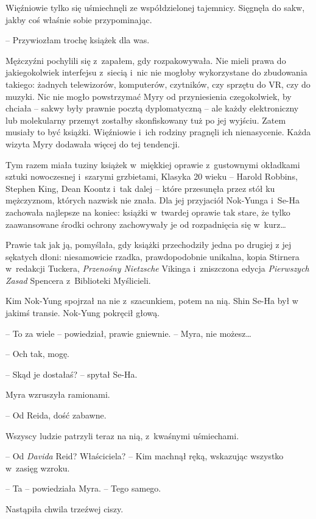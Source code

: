 \documentclass[oneside,polish,11pt,sfheadings]{mwbk}
\begin{document}
Więźniowie tylko się uśmiechnęli ze współdzielonej tajemnicy. Sięgnęła do
sakw, jakby coś właśnie sobie przypominając. 

-- Przywiozłam trochę
książek dla was.

Mężczyźni pochylili się z~zapałem, gdy rozpakowywała. Nie mieli prawa do
jakiegokolwiek interfejsu z~siecią i~nic nie mogłoby wykorzystane do
zbudowania takiego: żadnych telewizorów, komputerów, czytników, czy
sprzętu do VR, czy do muzyki. Nic nie mogło powstrzymać Myry od
przyniesienia czegokolwiek, by chciała -- sakwy były prawnie pocztą
dyplomatyczną -- ale każdy elektroniczny lub molekularny przemyt zostałby
skonfiskowany tuż po jej wyjściu. Zatem musiały to być książki.
Więźniowie i~ich rodziny pragnęli ich nienasycenie. Każda wizyta Myry
dodawała więcej do tej tendencji.

Tym razem miała tuziny książek w~miękkiej oprawie z~gustownymi okładkami
sztuki nowoczesnej i~szarymi grzbietami, Klasyka 20 wieku -- Harold
Robbins, Stephen King, Dean Koontz i~tak dalej -- które przesunęła przez
stół ku mężczyznom, których nazwisk nie znała. Dla jej przyjaciół
Nok-Yunga i~Se-Ha zachowała najlepsze na koniec: książki w~twardej
oprawie tak stare, że tylko zaawansowane środki ochrony zachowywały je
od rozpadnięcia się w~kurz\ldots

Prawie tak jak ją, pomyślała, gdy książki przechodziły jedna po drugiej
z jej sękatych dłoni: niesamowicie rzadka, prawdopodobnie unikalna,
kopia Stirnera w~redakcji Tuckera, \textit{Przenośny Nietzsche} Vikinga i~zniszczona edycja \textit{Pierwszych Zasad} Spencera z~Biblioteki
Myślicieli.

Kim Nok-Yung spojrzał na nie z~szacunkiem, potem na nią. Shin Se-Ha był
w jakimś transie. Nok-Yung pokręcił głową.

-- To za wiele -- powiedział, prawie gniewnie. -- Myra, nie możesz\ldots

-- Och tak, mogę.

-- Skąd je dostałaś? -- spytał Se-Ha.

Myra wzruszyła ramionami. 

-- Od Reida, dość zabawne.

Wszyscy ludzie patrzyli teraz na nią, z~kwaśnymi uśmiechami.

-- Od \textit{Davida} Reid? Właściciela? -- Kim machnął ręką, wskazując
wszystko w~zasięg wzroku.

-- Ta -- powiedziała Myra. -- Tego samego.

Nastąpiła chwila trzeźwej ciszy.
\end{document}
